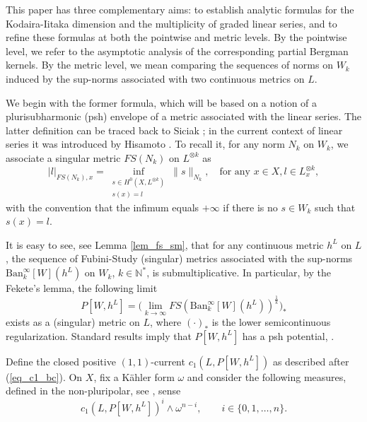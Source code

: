 \documentclass[12pt]{article}
\numberwithin{equation}{section}
\theoremstyle{theorem}
\theoremstyle{definition}
\theoremstyle{remark}
\newcommand{\nat}{\mathbb{N}}
\begin{document}
	\par 
	This paper has three complementary aims: to establish analytic formulas for the Kodaira-Iitaka dimension and the multiplicity of graded linear series, and to refine these formulas at both the pointwise and metric levels.
	By the pointwise level, we refer to the asymptotic analysis of the corresponding partial Bergman kernels. 
	By the metric level, we mean comparing the sequences of norms on $W_k$ induced by the sup-norms associated with two continuous metrics on $L$.
	\par 
	We begin with the former formula, which will be based on a notion of a plurisubharmonic (psh) envelope of a metric associated with the linear series.
	The latter definition can be traced back to Siciak \cite{SiciakEnvFirst}; in the current context of linear series it was introduced by Hisamoto \cite{HisamVolume}.
	To recall it, for any norm $N_k$ on $W_k$, we associate a singular metric $FS(N_k)$ on $L^{\otimes k}$ as
	\begin{equation}\label{eq_fs_norm}
		|l|_{FS(N_k), x}
		=
		\inf_{\substack{s \in H^0(X, L^{\otimes k}) \\ s(x) = l}}
		\| s \|_{N_k}, 
		\quad 
		\text{for any } x \in X, l \in L^{\otimes k}_x,
	\end{equation}
	with the convention that the infimum equals $+ \infty$ if there is no $s \in W_k$ such that $s(x) = l$.
	\par 
	It is easy to see, see Lemma \ref{lem_fs_sm}, that for any continuous metric $h^L$ on $L$, the sequence of Fubini-Study (singular) metrics associated with the sup-norms $\textrm{Ban}_k^{\infty}[W](h^L)$ on $W_k$, $k \in \nat^*$, is submultiplicative.
	In particular, by the Fekete's lemma, the following limit
	\begin{equation}\label{eq_env_w}
		P[W, h^L]
		=
		\Big(
		\lim_{k \to \infty} FS({\textrm{Ban}}_k^{\infty}[W](h^L))^{\frac{1}{k}}
		\Big)_*
	\end{equation}
	exists as a (singular) metric on $L$, where $(\cdot)_*$ is the lower semicontinuous regularization.
	Standard results imply that $P[W, h^L]$ has a psh potential, \cite[Proposition I.4.24]{DemCompl}.
	\par
	Define the closed positive $(1,1)$-current $c_1(L, P[W, h^L])$ as described after (\ref{eq_c1_bc}).
	On $X$, fix a Kähler form $\omega$ and consider the following measures, defined in the non-pluripolar, see \cite{BEGZ}, sense
	\begin{equation}\label{eq_meas_x_wedge}
		c_1(L, P[W, h^L])^{i} \wedge \omega^{n - i}, \qquad i \in \{0, 1, \ldots, n\}.
	\end{equation}
\end{document}
